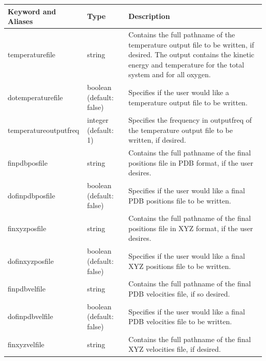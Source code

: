 \documentclass[11pt]{report}
\begin{document}
  \begin{tabular}{|p{5.5cm}|p{4cm}|p{6cm}|}\hline
    Keyword and Aliases & Type & Description   \\\hline\hline

    temperaturefile &
    string &
    Contains the full pathname of the temperature output file to be written, if
    desired.  The output contains the kinetic energy and temperature
    for the total system and for all oxygen.\\\hline

    dotemperaturefile &
    boolean (default: false) &
    Specifies if the user would like a temperature output  file to be written. \\\hline

    temperatureoutputfreq &
    integer (default: 1) &
    Specifies the frequency in outputfreq of the temperature output  file to be written, if desired.\\\hline\hline




    finpdbposfile &
    string &
    Contains the full pathname of the final positions file in PDB format, if the user desires. \\\hline
 
    dofinpdbposfile &
    boolean (default: false) &
    Specifies if the user would like a final PDB positions file to be written.  \\\hline

    finxyzposfile &
    string &
    Contains the full pathname of the final positions file in XYZ format, if the user desires.  \\\hline

    dofinxyzposfile &
    boolean (default: false) &
    Specifies if the user would like a final XYZ positions file to be written. \\\hline\hline

    finpdbvelfile &
    string &
    Contains the full pathname of the final PDB velocities file, if so desired.  \\\hline


    dofinpdbvelfile &
    boolean (default: false) &
    Specifies if the user would like a final PDB velocities file to be written. \\\hline


    finxyzvelfile &
    string &
    Contains the full pathname of the final XYZ velocities file, if desired.  \\\hline


\end{tabular}
\end{document}
